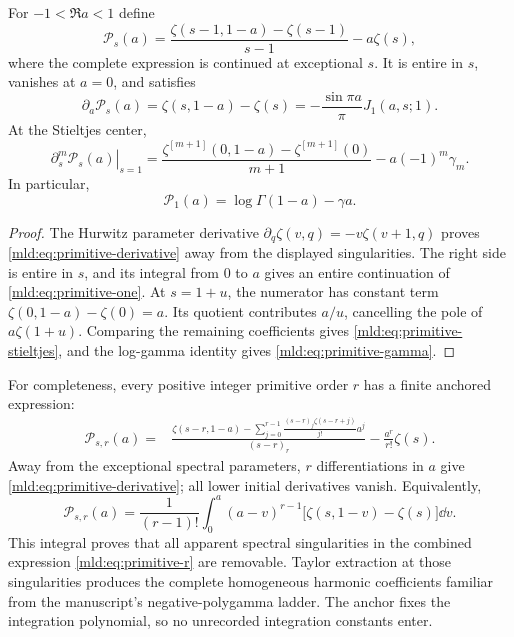 \begin{proposition}\label{mld:prop:primitive}
For $-1<\Re a<1$ define
\begin{equation}\label{mld:eq:primitive-one}
 \mathcal P_s(a)=
 \frac{\zeta(s-1,1-a)-\zeta(s-1)}{s-1}-a\zeta(s),
\end{equation}
where the complete expression is continued at exceptional $s$. It is entire in $s$, vanishes at $a=0$, and satisfies
\begin{equation}\label{mld:eq:primitive-derivative}
 \partial_a\mathcal P_s(a)
   =\zeta(s,1-a)-\zeta(s)
   =-\frac{\sin\pi a}{\pi}J_1(a,s;1).
\end{equation}
At the Stieltjes center,
\begin{equation}\label{mld:eq:primitive-stieltjes}
 \left.\partial_s^m\mathcal P_s(a)\right|_{s=1}
   =\frac{\zeta^{[m+1]}(0,1-a)-\zeta^{[m+1]}(0)}{m+1}
         -a(-1)^m\gamma_m.
\end{equation}
In particular,
\begin{equation}\label{mld:eq:primitive-gamma}
 \mathcal P_1(a)=\log\Gamma(1-a)-\gamma a.
\end{equation}
\end{proposition}
\begin{proof}
The Hurwitz parameter derivative
$\partial_q\zeta(v,q)=-v\zeta(v+1,q)$ proves
\eqref{mld:eq:primitive-derivative} away from the displayed singularities. The right side is entire in $s$, and its integral from $0$ to $a$ gives an entire continuation of \eqref{mld:eq:primitive-one}. At $s=1+u$, the numerator has constant term
$\zeta(0,1-a)-\zeta(0)=a$. Its quotient contributes $a/u$, cancelling the pole of $a\zeta(1+u)$. Comparing the remaining coefficients gives \eqref{mld:eq:primitive-stieltjes}, and the log-gamma identity gives \eqref{mld:eq:primitive-gamma}.
\end{proof}

For completeness, every positive integer primitive order $r$ has a finite anchored expression:
\begin{align}\label{mld:eq:primitive-r}
 \mathcal P_{s,r}(a)
  ={}&\frac{\displaystyle\zeta(s-r,1-a)
       -\sum_{j=0}^{r-1}\frac{(s-r)_j\zeta(s-r+j)}{j!}a^j}
                   {(s-r)_r}
        -\frac{a^r}{r!}\zeta(s).
\end{align}
Away from the exceptional spectral parameters, $r$ differentiations in $a$ give \eqref{mld:eq:primitive-derivative}; all lower initial derivatives vanish. Equivalently,
\[
 \mathcal P_{s,r}(a)=\frac1{(r-1)!}\int_0^a
       (a-v)^{r-1}\big[\zeta(s,1-v)-\zeta(s)\big]\dd v.
\]
This integral proves that all apparent spectral singularities in the combined expression \eqref{mld:eq:primitive-r} are removable. Taylor extraction at those singularities produces the complete homogeneous harmonic coefficients familiar from the manuscript's negative-polygamma ladder. The anchor fixes the integration polynomial, so no unrecorded integration constants enter.

